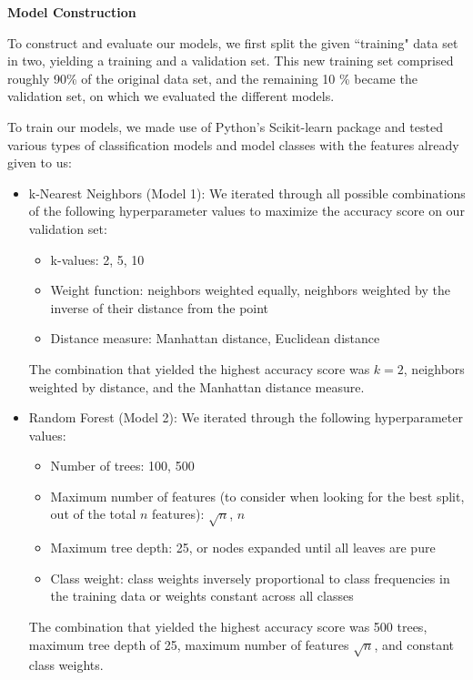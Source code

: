 \documentclass[11pt]{article}
\begin{document}
\begin{center}
    \textbf{Model Construction}
\end{center}

To construct and evaluate our models, we first split the given ``training" data set in two, yielding a training and a validation set. This new training set comprised roughly 90\% of the original data set, and the remaining 10
\% became the validation set, on which we evaluated the different models.
  
To train our models, we made use of Python's Scikit-learn package and tested various types of classification models and model classes with the features already given to us:
\begin{itemize}
  \item k-Nearest Neighbors (Model 1): We iterated through all possible combinations of the following hyperparameter values to maximize the accuracy score on our validation set:
  \begin{itemize}
      \item k-values: 2, 5, 10
      \item Weight function: neighbors weighted equally, neighbors weighted by the inverse of their distance from the point
      \item Distance measure: Manhattan distance, Euclidean distance
  \end{itemize}
  The combination that yielded the highest accuracy score was $k=2$, neighbors weighted by distance, and the Manhattan distance measure.
  
  \item Random Forest (Model 2): We iterated through the following hyperparameter values:
  \begin{itemize}
      \item Number of trees: 100, 500
      \item Maximum number of features (to consider when looking for the best split, out of the total $n$ features): $\sqrt{n}$, $n$  
      \item Maximum tree depth: 25, or nodes expanded until all leaves are pure
      \item Class weight: class weights inversely proportional to class frequencies in the training data or weights constant across all classes
  \end{itemize}
  The combination that yielded the highest accuracy score was 500 trees, maximum tree depth of 25, maximum number of features $\sqrt{n}$, and constant class weights. 
  

\end{itemize}
\end{document}

